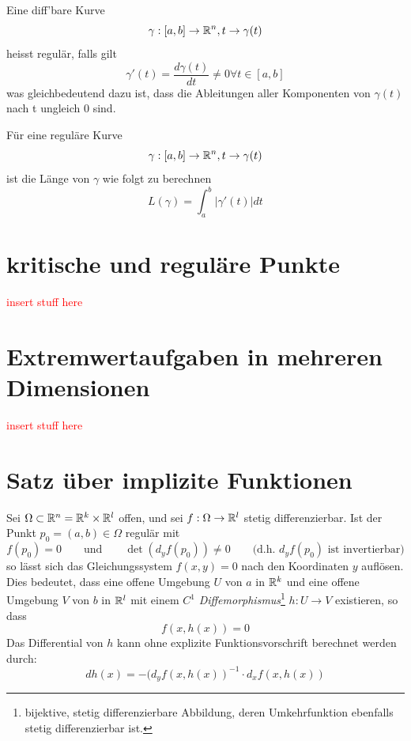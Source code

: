 \begin{definition}
    Eine diff'bare Kurve $$ \gamma: [a,b] \to \mathbb{R}^n, t \to \gamma(t)$$ heisst regulär, falls gilt $$\gamma'(t) = \frac{d\gamma(t)}{dt} \neq 0 \forall t \in [a,b]$$ was gleichbedeutend dazu ist, dass die Ableitungen aller Komponenten von $\gamma(t)$ nach t ungleich 0 sind.
\end{definition}

\begin{definition}
    Für eine reguläre Kurve $$ \gamma: [a,b] \to \mathbb{R}^n, t \to \gamma(t)$$ ist die Länge von $\gamma$ wie folgt zu berechnen $$L(\gamma) = \int_a^b |\gamma'(t)| dt $$
\end{definition}

\section{kritische und reguläre Punkte}
\textcolor{red}{insert stuff here}
\section{Extremwertaufgaben in mehreren Dimensionen}
\textcolor{red}{insert stuff here}

\section{Satz über implizite Funktionen}

\begin{theorem}
    Sei $\Omega \subset \mathbb{R}^n = \mathbb{R}^k \times \mathbb{R}^l$ offen, und sei $f: \Omega \to \mathbb{R}^l$ stetig differenzierbar. Ist der Punkt $p_0=(a,b) \in \Omega$ regulär mit
    $$ f(p_0) = 0 \quad \quad \mbox{und} \quad \quad \det(d_yf(p_0)) \neq 0 \quad \quad \mbox{(d.h. } d_yf(p_0) \mbox{ ist invertierbar)}$$
     so lässt sich das Gleichungssystem 
    $ f(x,y) = 0 $ nach den Koordinaten $y$ auflösen. Dies bedeutet, dass eine offene Umgebung $U$ von $a$ in $\mathbb{R}^k$ und eine offene Umgebung $V$ von $b$ in $\mathbb{R}^l$ mit einem $C^1$ \textit{Diffemorphismus}\footnote{bijektive, stetig differenzierbare Abbildung, deren Umkehrfunktion ebenfalls stetig differenzierbar ist.} $h: U \to V$ existieren, so dass 
    $$ f(x, h(x)) = 0$$
    Das Differential von $h$ kann ohne explizite Funktionsvorschrift berechnet werden durch:
    $$ dh(x) = - (d_yf(x, h(x))^{-1} \cdot d_xf(x, h(x))$$
\end{theorem}

